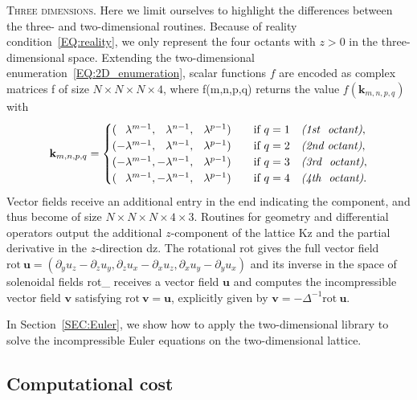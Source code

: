 \documentclass[12pt]{article}
\theoremstyle{definition}
\begin{document}
	\medskip
	\textsc{Three dimensions.}
	Here we limit ourselves to highlight the differences between the three- and two-dimensional routines.
	Because of reality condition~\eqref{EQ:reality}, we only represent the four octants with $z>0$ in the three-dimensional space.
	Extending the two-dimensional enumeration~\eqref{EQ:2D_enumeration}, scalar functions $f$ are encoded as complex matrices {\mlttfamily f} of size $N \times N \times N \times 4$, where {\mlttfamily f(m,n,p,q)} returns the value $f(\mathbf{k}_{m,n,p,q})$ with
	\begin{equation}
	\mathbf{k}_{m,n,p,q} =
	\begin{cases}
	(\phantom{-}\lambda^{m-1},\phantom{-}\lambda^{n-1},\phantom{-}\lambda^{p-1}) \quad &\text{if} \ q=1 \quad \textit{(1st \phantom{-}octant)},\\
	(-\lambda^{m-1},\phantom{-}\lambda^{n-1},\phantom{-}\lambda^{p-1}) \quad &\text{if} \ q=2 \quad \textit{(2nd octant)},\\
	(-\lambda^{m-1},-\lambda^{n-1},\phantom{-}\lambda^{p-1}) \quad &\text{if} \ q=3 \quad \textit{(3rd \phantom{-}octant)},\\
	(\phantom{-}\lambda^{m-1},-\lambda^{n-1},\phantom{-}\lambda^{p-1}) \quad &\text{if} \ q=4 \quad \textit{(4th \phantom{-}octant)}.
	\end{cases}
	\end{equation}
	Vector fields receive an additional entry in the end indicating the component, and thus become of size $N \times N \times N \times 4 \times 3$.
	Routines for geometry and differential operators output the additional $z$-component of the lattice {\mlttfamily Kz} and the partial derivative in the $z$-direction {\mlttfamily dz}.
	The rotational {\mlttfamily rot} gives the full vector field $\text{rot} \ \mathbf{u} = (\partial_yu_z - \partial_zu_y, \partial_zu_x - \partial_xu_z, \partial_xu_y - \partial_yu_x)$ and its inverse in the space of solenoidal fields {\mlttfamily rot\_} receives a vector field $\mathbf{u}$ and computes the incompressible vector field $\mathbf{v}$ satisfying $\text{rot} \ \mathbf{v} = \mathbf{u}$, explicitly given by $\mathbf{v} = -\Delta^{-1} \text{rot} \ \mathbf{u}$.
	\bigskip
	
	In Section~\ref{SEC:Euler}, we show how to apply the two-dimensional library to solve the incompressible Euler equations on the two-dimensional lattice.
	
	\subsection{Computational cost}\label{SEC:cost}
	
\end{document}
